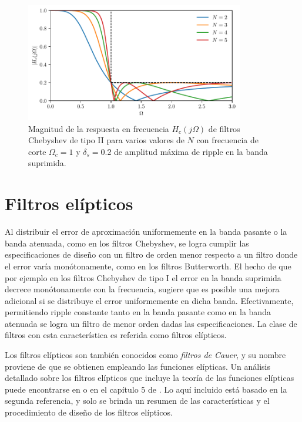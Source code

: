 \documentclass[a4paper]{report}
\begin{document}
\begin{figure}[!htb]
 \begin{center}
 \includegraphics[width=0.85\textwidth]{figuras/continuous_filters_chebyshev_II_responses.pdf}
 \caption{\label{fig:continuous_filters_chebyshev_II_responses} Magnitud de la respuesta en frecuencia \(H_c(j\Omega)\) de filtros Chebyshev de tipo II para varios valores de \(N\) con frecuencia de corte \(\Omega_c=1\) y \(\delta_s=0.2\) de amplitud máxima de ripple en la banda suprimida.}
 \end{center}
\end{figure}

\section{Filtros elípticos}

Al distribuir el error de aproximación uniformemente en la banda pasante o la banda atenuada, como en los filtros Chebyshev, se logra cumplir las especificaciones de diseño con un filtro de orden menor respecto a un filtro donde el error varía monótonamente, como en los filtros Butterworth. El hecho de que por ejemplo en los filtros Chebyshev de tipo I el error en la banda suprimida decrece monótonamente con la frecuencia, sugiere que es posible una mejora adicional si se distribuye el error uniformemente en dicha banda. Efectivamente, permitiendo ripple constante tanto en la banda pasante como en la banda atenuada se logra un filtro de menor orden dadas las especificaciones. La clase de filtros con esta característica es referida como filtros elípticos. 

Los filtros elípticos son también conocidos como \emph{filtros de Cauer}, y su nombre proviene de que se obtienen empleando las funciones elípticas. Un análisis detallado sobre los filtros elípticos que incluye la teoría de las funciones elípticas puede encontrarse en \cite{orfanidis2006lecture} o en el capítulo 5 de \cite{daniels1974approximation}. Lo aquí incluido está basado en la segunda referencia, y solo se brinda un resumen de las características y el procedimiento de diseño de los filtros elípticos.
\end{document}
